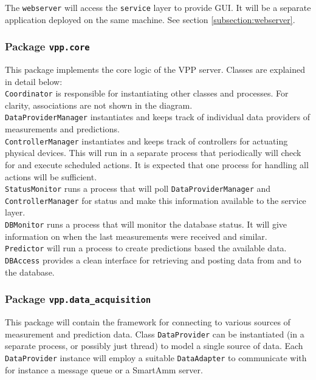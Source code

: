 The \texttt{webserver} will access the \texttt{service} layer to provide GUI. It will be a separate application deployed on the same machine. See section \ref{subsection:webserver}.

\subsubsection{Package \texttt{vpp.core}}
This package implements the core logic of the VPP server. Classes are explained in detail below:\\

\texttt{Coordinator} is responsible for instantiating other classes and processes. For clarity, associations are not shown in the diagram.\\

\texttt{DataProviderManager} instantiates and keeps track of individual data providers of measurements and predictions. \\

\texttt{ControllerManager} instantiates and keeps track of controllers for actuating physical devices. This will run in a separate process that periodically will check for and execute scheduled actions. It is expected that one process for handling all actions will be sufficient. \\

\texttt{StatusMonitor} runs a process that will poll \texttt{DataProviderManager} and \texttt{ControllerManager} for status and make this information available to the service layer.\\

\texttt{DBMonitor} runs a process that will monitor the database status. It will give information on when the last measurements were received and similar.\\

\texttt{Predictor} will run a process to create predictions based the available data.\\

\texttt{DBAccess} provides a clean interface for retrieving and posting data from and to the database. 

\subsubsection{Package \texttt{vpp.data\_acquisition}}
This package will contain the framework for connecting to various sources of measurement and prediction data. Class \texttt{DataProvider} can be instantiated (in a separate process, or possibly just thread) to model a single source of data. Each \texttt{DataProvider} instance will employ a suitable \texttt{DataAdapter} to communicate with for instance a message queue or a SmartAmm server.

